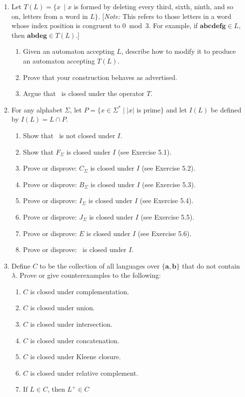 \begin{enumerate}[{5.}1. ]
\item Let $T(L)=\{x\  \mid x$ is formed by deleting every third, sixth, ninth, and so
on, letters from a word in $L\}$. [\emph{Note:} This refers to those letters in
a word whose index position is congruent to $0 \bmod{3}$. For example, if
$\pmb{abcdefg} \in L$, then $\pmb{abdeg} \in T(L)$.]
\begin{enumerate}
\item Given an automaton accepting $L$, describe how to modify it to produce an
automaton accepting $T(L)$.
\item Prove that your construction behaves as advertised.
\item Argue that \DSIG\ is closed under the operator $T$.
\end{enumerate}

\item For any alphabet $\Sigma$,
let $P=\{x\in\Sigma^* \mid |x|$ is prime$\}$ and let $I(L)$ be defined by
$I(L) = L \cap P$.
\begin{enumerate}
\item Show that \DSIG\ is not closed under $I$.
\item Show that $F_\Sigma$ is closed under $I$ (see Exercise 5.1).
\item Prove or disprove: $C_\Sigma$ is closed under $I$ (see Exercise 5.2).
\item Prove or disprove: $B_\Sigma$ is closed under $I$ (see Exercise 5.3).
\item Prove or disprove: $I_\Sigma$ is closed under $I$ (see Exercise 5.4).
\item Prove or disprove: $J_\Sigma$ is closed under $I$ (see Exercise 5.5).
\item Prove or disprove: $E$ is closed under $I$ (see Exercise 5.6).
\item Prove or disprove: \NSIG\ is closed under $I$.
\end{enumerate}

\item Define $C$ to be the collection of all languages over
$\{\pmb{a},\pmb{b}\}$ that do not contain $\lambda$. Prove or give
counterexamples to the following:
\begin{enumerate}
\item $C$ is closed under complementation.
\item $C$ is closed under union.
\item $C$ is closed under intersection.
\item $C$ is closed under concatenation.
\item $C$ is closed under Kleene closure.
\item $C$ is closed under relative complement.
\item If $L \in C$, then $L^+ \in C$
\end{enumerate}


\end{enumerate}
